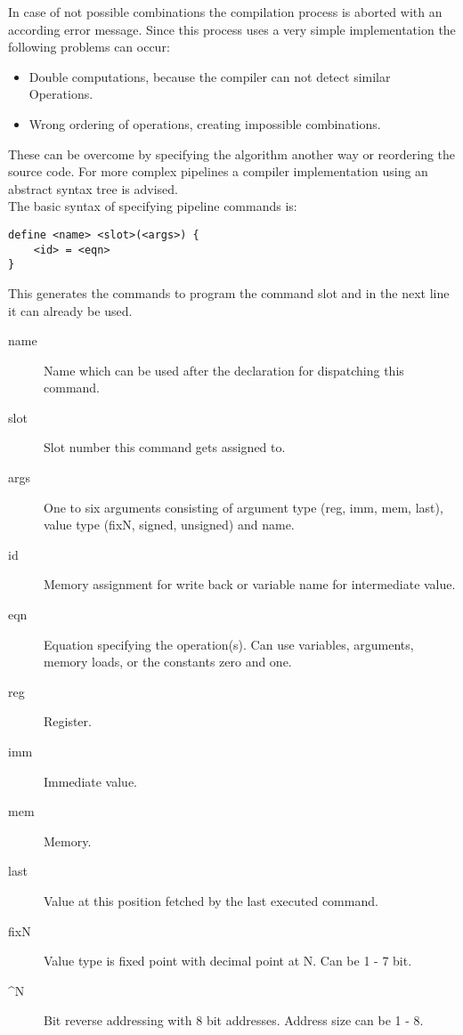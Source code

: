 \documentclass[11pt,twocolumn,technote,a4paper]{IEEEtran}
\begin{document}
In case of not possible combinations the compilation process is aborted with
an according error message. Since this process uses a very simple
implementation the following problems can occur:
\begin{itemize}
    \item Double computations, because the compiler can not detect similar
        Operations.
    \item Wrong ordering of operations, creating impossible combinations.
\end{itemize}
These can be overcome by specifying the algorithm another way or reordering
the source code. For more complex pipelines a compiler implementation using
an abstract syntax tree is advised.\\
The basic syntax of specifying pipeline commands is:
\begin{lstlisting}
define <name> <slot>(<args>) {
    <id> = <eqn>
}
\end{lstlisting}
This generates the commands to program the command slot and in the next line it
can already be used.
\begin{description}
     \item[name] Name which can be used after the declaration for dispatching
         this command.
     \item[slot] Slot number this command gets assigned to.
     \item[args] One to six arguments consisting of argument type
         (reg, imm, mem, last), value type (fixN, signed, unsigned) and name.
     \item[id] Memory assignment for write back or variable name for
         intermediate value.
     \item[eqn] Equation specifying the operation(s). Can use variables,
         arguments, memory loads, or the constants zero and one.
\end{description}
\begin{description}
    \item[reg] Register.
    \item[imm] Immediate value.
    \item[mem] Memory.
    \item[last] Value at this position fetched by the last executed command.
    \item[fixN] Value type is fixed point with decimal point at N. Can be 1 - 7 bit.
    \item[\textasciicircum{}N] Bit reverse addressing with 8 bit addresses. Address size can be
        1 - 8.
\end{description}
\end{document}
